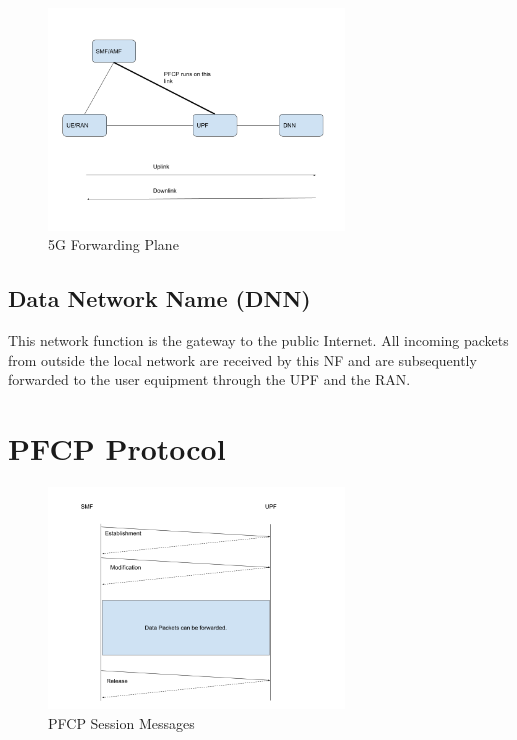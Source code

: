  \begin{figure}[htbp]
    \centering
    \includegraphics[width=0.7\textwidth, keepaspectratio]{./fig/Introduction/5GSecond.png}
    \caption{5G Forwarding Plane}
    \label{fig5Gforwarding}
\end{figure}
\subsection{Data Network Name (DNN) \label{sec:DNN}}
This network function is the gateway to the public Internet. All incoming packets from outside the
 local network are received by this NF and are subsequently forwarded to the user equipment through
   the UPF and the RAN. 

\section {PFCP Protocol\label{sec:PFCP}}
 \begin{figure}[htbp]
    \centering
    \includegraphics[width=0.7\textwidth, keepaspectratio]{./fig/Introduction/PFCP.png}
    \caption{PFCP Session Messages}
    \label{fig:PFCP}
\end{figure}


